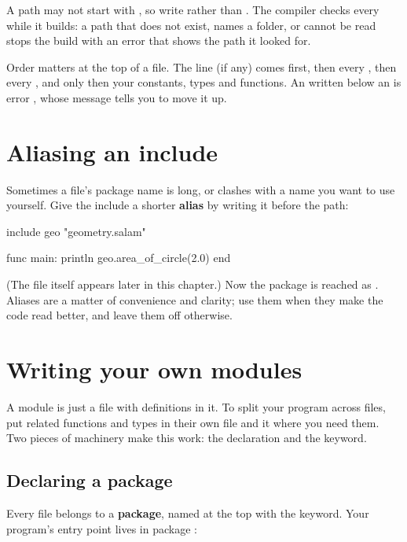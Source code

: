 A path may not start with , so write 
rather than . The compiler checks every  while it
builds: a path that does not exist, names a folder, or cannot be read stops the
build with an error that shows the path it looked for.

Order matters at the top of a file. The  line (if any) comes
first, then every , then every , and only then your
constants, types and functions. An  written below an
 is error , whose message tells you to move it up.

\section{Aliasing an include}

Sometimes a file's package name is long, or clashes with a name you want to use
yourself. Give the include a shorter \textbf{alias} by writing it before the path:

\begin{salamen}
include geo "geometry.salam"

func main:
    println geo.area_of_circle(2.0)
end
\end{salamen}

(The file  itself appears later in this chapter.) Now the  package is reached as . Aliases are a matter of
convenience and clarity; use them when they make the code read better, and leave
them off otherwise.

\section{Writing your own modules}

A module is just a  file with definitions in it. To split your
program across files, put related functions and types in their own file and
 it where you need them. Two pieces of machinery make this work: the 
declaration and the  keyword.

\subsection{Declaring a package}

Every file belongs to a \textbf{package}, named at the top with the 
keyword. Your program's entry point lives in package :


